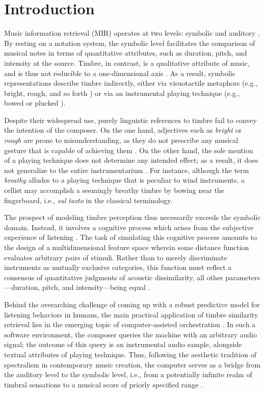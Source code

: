 \documentclass{bmcart}
\makeatletter
\newcommand*{\eg}{e.g.,\@\xspace}
\newcommand*{\ie}{i.e.,\@\xspace}
\makeatother
\begin{document}
\section*{Introduction}
\label{sec:intro}

Music information retrieval (MIR) operates at two levels: symbolic and auditory \cite{downie2003mir}.
By resting on a notation system, the symbolic level facilitates the comparison of musical notes in terms of quantitative attributes, such as duration, pitch, and intensity at the source.
Timbre, in contrast, is a qualitative attribute of music, and is thus not reducible to a one-dimensional axis \cite{siedenburg2019chapter}.
As a result, symbolic representations describe timbre indirectly, either via visuotactile metaphors (\eg{} bright, rough, and so forth \cite{faure1996icmpc}) or via an instrumental playing technique (\eg{} bowed or plucked \cite{kostka2016book}).

Despite their widespread use, purely linguistic references to timbre fail to convey the intention of the composer.
On the one hand, adjectives such as \emph{bright} or \emph{rough} are prone to misunderstanding, as they do not prescribe any musical gesture that is capable of achieving them \cite{antoine2018isma}.
On the other hand, the sole mention of a playing technique does not determine any intended effect; as a result, it does not generalize to the entire instrumentarium \cite{kolozali2011ismir}.
For instance, although the term \emph{breathy} alludes to a playing technique that is peculiar to wind instruments, a cellist may accomplish a seemingly breathy timbre by bowing near the fingerboard, i.e., \emph{sul tasto} in the classical terminology.

The prospect of modeling timbre perception thus necessarily exceeds the symbolic domain.
Instead, it involves a cognitive process which arises from the subjective experience of listening \cite{erickson1975book}.
The task of simulating this cognitive process amounts to the design of a multidimensional feature space wherein some distance function evaluates arbitrary pairs of stimuli.
Rather than to merely discriminate instruments as mutually exclusive categories, this function must reflect a consensus of quantitative judgments of acoustic dissimilarity, all other parameters---duration, pitch, and intensity---being equal \cite{thoret2018jasa}.

Behind the overarching challenge of coming up with a robust predictive model for listening behaviors in humans, the main practical application of timbre similarity retrieval lies in the emerging topic of computer-assisted orchestration \cite{maresz2013cmr}.
In such a software environment, the composer queries the machine with an arbitrary audio signal; the outcome of this query is an instrumental audio sample, alongside textual attributes of playing technique.
Thus, following the aesthetic tradition of spectralism in contemporary music creation, the computer serves as a bridge from the auditory level to the symbolic level, \ie{} from a potentially infinite realm of timbral sensations to a musical score of priorly specified range \cite{caetano2019swarm}.
\end{document}
